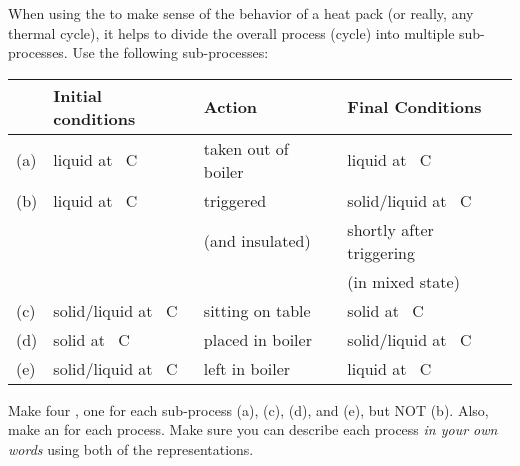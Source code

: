 \label{FNT1.1.3-2}

When using the \EnergyInteractionModel{} to make sense of the behavior of a heat pack (or really, any thermal cycle), it helps to divide the overall process (cycle) into multiple sub-processes.  Use the following sub-processes:

\begin{center}
\begin{tabular}{llll}
	\hline\hline
	&	Initial conditions	&	Action	&	Final Conditions\\
	\hline
	(a)	&	liquid at \unit[100]{\textdegree C}	&	taken out of boiler	&	liquid at \unit[23]{\textdegree C}\\
	(b)	&	liquid at \unit[23]{\textdegree C}	&	triggered	&	solid/liquid at \unit[54]{\textdegree C}\\&& (and insulated)	& shortly after triggering\\&&& (in mixed state)\\
	(c)	&	solid/liquid at \unit[54]{\textdegree C}	&	sitting on table	&	 solid at \unit[23]{\textdegree C}\\
	(d)	&	solid at \unit[23]{\textdegree C}	&	placed in boiler	&	solid/liquid at \unit[54]{\textdegree C}\\
	(e)	&	solid/liquid at \unit[54]{\textdegree C}	&	left in boiler	&	liquid at \unit[100]{\textdegree C}\\
	\hline\hline
\end{tabular}
\end{center}

\noindent Make four \TempGraphs{}, one for each sub-process (a), (c), (d), and (e), but NOT (b). Also, make an \EnergyDiagram{} for each process. Make sure you can describe each process {\em in your own words} using both of the representations. 